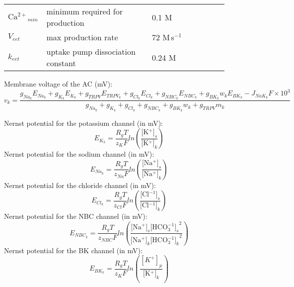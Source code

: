 \documentclass[fleqn]{report}
\numberwithin{equation}{section}
\numberwithin{equation}{section}
\newcommand{\Nas}{\text{[Na$^+]_{s}$}}
\newcommand{\Nak}{\text{[Na$^+]_{k}$}}
\newcommand{\Ks}{\text{[K$^{+}]_s$}}
\newcommand{\Cls}{\text{[Cl$^{-1}]_s$}}
\newcommand{\Clk}{\text{[Cl$^{-1}]_k$}}
\newcommand{\HCOs}{\text{[HCO$_{3}^{-1}]_s$}}
\newcommand{\HCOk}{\text{[HCO$_{3}^{-1}]_k$}}
\newcommand{\Kk}{\text{[K$^{+}]_k$}}
\newcommand{\Ca}{\text{Ca$^{2+}$}}
\newcommand{\EET}{\text{EET}}
\newcommand{\microM}{\textmu M}
\newcommand{\uMpers}{\textmu M\,s$^{-1}$}
\begin{document}
\begin{table}[h!]
										\centering
										\begin{tabular}{ p{0.07\linewidth}  >{\footnotesize} p{0.47\linewidth}  >{\footnotesize} p{0.17\linewidth} >{\footnotesize} p{0.17\linewidth} }
											\hline
											$ \Ca_{min} $ 	& minimum \Ca required for \EET production	& 0.1 \microM 	& \\ 
												$ V_{eet} $ 	& \EET max production rate & 72 \uMpers	& \\ 
												$ k_{eet} $ 	& \Ca uptake pump dissociation constant	& 0.24 \microM 	& \\ 
											\hline
										\end{tabular}
									\end{table}
	
Membrane voltage of the \gls{AC} (mV):
\begin{equation} \label{eq:v_k}
v_k=\frac{g_{Na_k}E_{Na_k}+g_{K_k}E_{K_k}+g_{TRPV}E_{TRPV_{k}}+g_{Cl_k}E_{Cl_k}+g_{NBC_k}E_{NBC_k} + g_{BK_k}w_kE_{BK_k} -J_{NaK_k}F \times 10^3 }{ g_{Na_k}+g_{K_k}+g_{Cl_k}+g_{NBC_k}+g_{BK_k}w_k +g_{TRPV}m_{k}}
\end{equation}
%

Nernst potential for the potassium channel (in mV):
\begin{equation} \label{eq:E_K}
E_{K_k}=\frac{R_gT}{z_K F}ln\left( \frac{\Ks}{\Kk}\right) 
\end{equation}
%
Nernst potential for the sodium channel (in mV):
\begin{equation} \label{eq:E_Na}
E_{Na_k}=\frac{R_gT}{z_{Na} F}ln\left( \frac{\Nas}{\Nak}\right) 
\end{equation}
%
Nernst potential for the chloride channel (in mV):
\begin{equation} \label{eq:E_Cl}
E_{Cl_k}=\frac{R_gT}{z_{Cl} F}ln\left( \frac{\Cls}{\Clk}\right) 
\end{equation}
%
Nernst potential for the NBC channel (in mV):
\begin{equation} \label{eq:E_NBC}
E_{NBC_k}=\frac{R_gT}{z_{NBC} F}ln\left( \frac{\Nas {\HCOs}^2}{\Nak{\HCOk}^2}\right) 
\end{equation}
Nernst potential for the BK channel (in mV):
\begin{equation} \label{eq:E_BK}
E_{BK_k}=\frac{R_gT}{z_K F}ln\left( \frac{[K^+]_p}{\Kk}\right) 
\end{equation}
%
\end{document}
